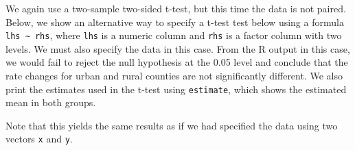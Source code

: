 \documentclass[
  letterpaper,
]{krantz}
\makeatletter
\newenvironment{Shaded}{\begin{snugshade}}{\end{snugshade}}
\newcommand{\AttributeTok}[1]{\textcolor[rgb]{0.40,0.45,0.13}{#1}}
\newcommand{\CommentTok}[1]{\textcolor[rgb]{0.37,0.37,0.37}{#1}}
\newcommand{\FunctionTok}[1]{\textcolor[rgb]{0.28,0.35,0.67}{#1}}
\newcommand{\NormalTok}[1]{\textcolor[rgb]{0.00,0.23,0.31}{#1}}
\newcommand{\OtherTok}[1]{\textcolor[rgb]{0.00,0.23,0.31}{#1}}
\newcommand{\SpecialCharTok}[1]{\textcolor[rgb]{0.37,0.37,0.37}{#1}}
\newenvironment{kframe}{%
\medskip{}
\setlength{\fboxsep}{.8em}
 \def\at@end@of@kframe{}%
 \ifinner\ifhmode%
  \def\at@end@of@kframe{\end{minipage}}%
  \begin{minipage}{\columnwidth}%
 \fi\fi%
 \def\FrameCommand##1{\hskip\@totalleftmargin \hskip-\fboxsep
 \colorbox{shadecolor}{##1}\hskip-\fboxsep
     \hskip-\linewidth \hskip-\@totalleftmargin \hskip\columnwidth}%
 \MakeFramed {\advance\hsize-\width
   \@totalleftmargin\z@ \linewidth\hsize
   \@setminipage}}%
 {\par\unskip\endMakeFramed%
 \at@end@of@kframe}
\renewenvironment{Shaded}{\begin{kframe}}{\end{kframe}}
\makeatother
\begin{document}
We again use a two-sample two-sided t-test, but this time the data is
not paired. Below, we show an alternative way to specify a t-test test
below using a formula \texttt{lhs\ \textasciitilde{}\ rhs}, where
\texttt{lhs} is a numeric column and \texttt{rhs} is a factor column
with two levels. We must also specify the data in this case. From the R
output in this case, we would fail to reject the null hypothesis at the
0.05 level and conclude that the rate changes for urban and rural
counties are not significantly different. We also print the estimates
used in the t-test using \texttt{estimate}, which shows the estimated
mean in both groups.

\begin{Shaded}
\end{Shaded}

Note that this yields the same results as if we had specified the data
using two vectors \texttt{x} and \texttt{y}.
\end{document}
